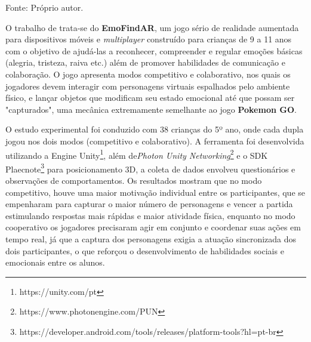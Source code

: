 \begin{table}[H]
\centering
\caption{Estudos com aplicação de jogos sérios}
\label{tab:seriousgames}
\par
\vspace{2mm}
\footnotesize Fonte: Próprio autor.
\end{table}

O trabalho de  trata-se do \textbf{EmoFindAR}, um jogo sério de realidade aumentada para dispositivos móveis e \textit{multiplayer} construído para crianças de 9 a 11 anos com o objetivo de ajudá-las a reconhecer, compreender e regular emoções básicas (alegria, tristeza, raiva etc.) além de promover habilidades de comunicação e colaboração. O jogo apresenta modos competitivo e colaborativo, nos quais os jogadores devem interagir com personagens virtuais espalhados pelo ambiente físico, e lançar objetos que modificam seu estado emocional até que possam ser "capturados", uma mecânica extremamente semelhante ao jogo \textbf{Pokemon GO}.

O estudo experimental foi conduzido com 38 crianças do 5º ano, onde cada dupla jogou nos dois modos (competitivo e colaborativo). A ferramenta foi desenvolvida utilizando a Engine Unity\footnote{https://unity.com/pt}, além de\textit{Photon Unity Networking}\footnote{https://www.photonengine.com/PUN} e o SDK Plaecnote\footnote{https://developer.android.com/tools/releases/platform-tools?hl=pt-br} para posicionamento 3D, a coleta de dados envolveu questionários e observações de comportamentos. Os resultados mostram que no modo competitivo, houve uma maior motivação individual entre os participantes, que se empenharam para capturar o maior número de personagens e vencer a partida estimulando respostas mais rápidas e maior atividade física, enquanto no modo cooperativo os jogadores precisaram agir em conjunto e coordenar suas ações em tempo real, já que a captura dos personagens exigia a atuação sincronizada dos dois participantes, o que reforçou o desenvolvimento de habilidades sociais e emocionais entre os alunos.

